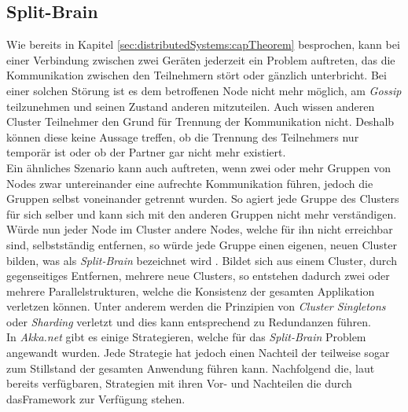 \subsection{Split-Brain} 
\label{subsec:implementation:splitBrain}
Wie bereits in Kapitel \ref{sec:distributedSystems:capTheorem} besprochen, kann bei einer Verbindung zwischen zwei Geräten jederzeit ein Problem auftreten, das die Kommunikation zwischen den Teilnehmern stört oder gänzlich unterbricht. Bei einer solchen Störung ist es dem betroffenen Node nicht mehr möglich, am \textit{Gossip} teilzunehmen und seinen Zustand anderen mitzuteilen. Auch wissen anderen Cluster Teilnehmer den Grund für Trennung der Kommunikation nicht. Deshalb können diese keine Aussage treffen, ob die Trennung des Teilnehmers nur temporär ist oder ob der Partner gar nicht mehr existiert. \\
Ein ähnliches Szenario kann auch auftreten, wenn zwei oder mehr Gruppen von Nodes zwar untereinander eine aufrechte Kommunikation führen, jedoch die Gruppen selbst voneinander getrennt wurden. So agiert jede Gruppe des Clusters für sich selber und kann sich  mit den anderen Gruppen nicht mehr verständigen. Würde nun jeder Node im Cluster andere Nodes, welche für ihn nicht erreichbar sind, selbstständig entfernen, so würde jede Gruppe einen eigenen, neuen Cluster bilden, was als \textit{Split-Brain} bezeichnet wird \citep{networkIsReliable}. Bildet sich aus einem Cluster, durch gegenseitiges Entfernen, mehrere neue Clusters, so entstehen dadurch zwei oder mehrere Parallelstrukturen, welche die Konsistenz der gesamten Applikation verletzen können. Unter anderem werden die Prinzipien von \textit{Cluster Singletons} oder \textit{Sharding} verletzt und dies kann entsprechend zu Redundanzen führen. \\
In \textit{Akka.net} gibt es einige Strategieren, welche für das \textit{Split-Brain} Problem angewandt wurden. Jede Strategie hat jedoch einen Nachteil der teilweise sogar zum Stillstand der gesamten Anwendung führen kann. Nachfolgend die, laut \cite{Akka.netCommunityAkka.NETDocumentation} bereits verfügbaren, Strategien mit ihren Vor- und Nachteilen die durch dasFramework zur Verfügung stehen.
